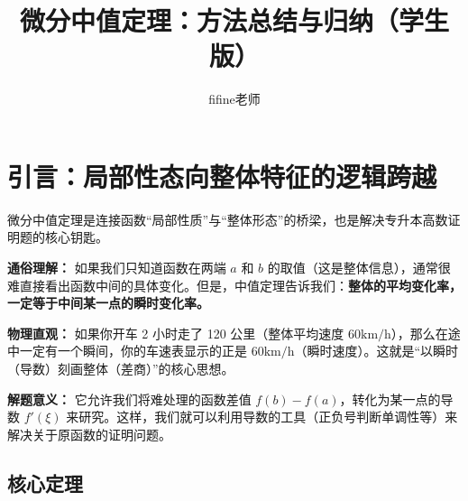 \documentclass[UTF8]{ctexart}
\begin{document}
\title{\textbf{微分中值定理：方法总结与归纳（学生版）}}
\author{fifine老师}
\date{}
\maketitle


\section{引言：局部性态向整体特征的逻辑跨越}
微分中值定理是连接函数“局部性质”与“整体形态”的桥梁，也是解决专升本高数证明题的核心钥匙。

\textbf{通俗理解：}
如果我们只知道函数在两端 $a$ 和 $b$ 的取值（这是整体信息），通常很难直接看出函数中间的具体变化。但是，中值定理告诉我们：\textbf{整体的平均变化率，一定等于中间某一点的瞬时变化率。}

\textbf{物理直观：}
如果你开车 2 小时走了 120 公里（整体平均速度 $60\text{km/h}$），那么在途中一定有一个瞬间，你的车速表显示的正是 $60\text{km/h}$（瞬时速度）。这就是“以瞬时（导数）刻画整体（差商）”的核心思想。

\textbf{解题意义：}
它允许我们将难处理的函数差值 $f(b)-f(a)$，转化为某一点的导数 $f'(\xi)$ 来研究。这样，我们就可以利用导数的工具（正负号判断单调性等）来解决关于原函数的证明问题。

\subsection*{核心定理}
\end{document}
